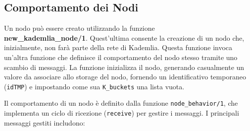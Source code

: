 \documentclass{article}
\begin{document}
\subsection{Comportamento dei Nodi}
Un nodo può essere creato utilizzando la funzione\\
\textbf{new\_kademlia\_node/1}. Quest'ultima consente la creazione di un nodo che, inizialmente, non farà parte della rete di Kademlia. Questa funzione invoca un'altra funzione che definisce il comportamento del nodo stesso tramite uno scambio di messaggi. La funzione inizializza il nodo, generando casualmente un valore da associare allo storage del nodo, fornendo un identificativo temporaneo (\texttt{idTMP}) e impostando come sua \texttt{K\_buckets} una lista vuota.

Il comportamento di un nodo è definito dalla funzione \texttt{node\_behavior/1}, che implementa un ciclo di ricezione (\texttt{receive}) per gestire i messaggi. I principali messaggi gestiti includono:
\end{document}
